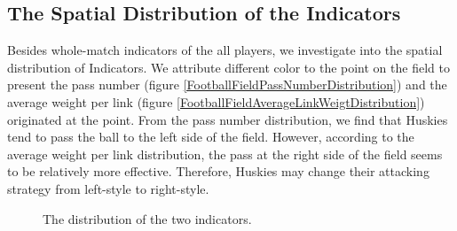 \documentclass[12pt]{article}
\begin{document}
\subsection{The Spatial Distribution of the Indicators}
Besides whole-match indicators of the all players, we investigate into the spatial distribution of Indicators. We attribute different color to the point on the field to present the pass number (figure \ref{FootballFieldPassNumberDistribution}) and the average weight per link (figure \ref{FootballFieldAverageLinkWeigtDistribution}) originated at the point. From the pass number distribution, we find that Huskies tend to pass the ball to the left side of the field. However, according to the average weight per link distribution, the pass at the right side of the field seems to be relatively more effective. Therefore, Huskies may change their attacking strategy from left-style to right-style.
\begin{figure}[h]
	\centering
	\caption{The distribution of the two indicators.}
\end{figure}
\end{document}
